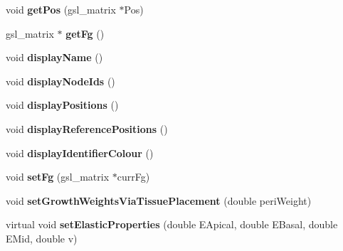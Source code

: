 \begin{DoxyCompactItemize}
\item 
\hypertarget{classShapeBase_ab1906a5afda8fcbeef23010759f2538c}{}void {\bfseries get\+Pos} (gsl\+\_\+matrix $\ast$Pos)\label{classShapeBase_ab1906a5afda8fcbeef23010759f2538c}

\item 
\hypertarget{classShapeBase_a79889ef9cb7831a50e5391cb1cc19793}{}gsl\+\_\+matrix $\ast$ {\bfseries get\+Fg} ()\label{classShapeBase_a79889ef9cb7831a50e5391cb1cc19793}

\item 
\hypertarget{classShapeBase_ab8a7323c50767ecdc82d8d8ce411b264}{}void {\bfseries display\+Name} ()\label{classShapeBase_ab8a7323c50767ecdc82d8d8ce411b264}

\item 
\hypertarget{classShapeBase_a324f8fd5dd90c14b621b2f2ee3ec98db}{}void {\bfseries display\+Node\+Ids} ()\label{classShapeBase_a324f8fd5dd90c14b621b2f2ee3ec98db}

\item 
\hypertarget{classShapeBase_aca4d0f70caf459dc93f914ef7fc2a053}{}void {\bfseries display\+Positions} ()\label{classShapeBase_aca4d0f70caf459dc93f914ef7fc2a053}

\item 
\hypertarget{classShapeBase_af2d221cf63220dad3ecf139ffa164698}{}void {\bfseries display\+Reference\+Positions} ()\label{classShapeBase_af2d221cf63220dad3ecf139ffa164698}

\item 
\hypertarget{classShapeBase_aba6bb76d8adffaeb7ad36cce8a3f17ab}{}void {\bfseries display\+Identifier\+Colour} ()\label{classShapeBase_aba6bb76d8adffaeb7ad36cce8a3f17ab}

\item 
\hypertarget{classShapeBase_ad39c3f3a555a89e106c4afaaf81c72f6}{}void {\bfseries set\+Fg} (gsl\+\_\+matrix $\ast$curr\+Fg)\label{classShapeBase_ad39c3f3a555a89e106c4afaaf81c72f6}

\item 
\hypertarget{classShapeBase_a38a100fb162232636bf666eb1603f023}{}void {\bfseries set\+Growth\+Weights\+Via\+Tissue\+Placement} (double peri\+Weight)\label{classShapeBase_a38a100fb162232636bf666eb1603f023}

\item 
\hypertarget{classShapeBase_a948e9da80e40851c9813f8251d1979ec}{}virtual void {\bfseries set\+Elastic\+Properties} (double E\+Apical, double E\+Basal, double E\+Mid, double v)\label{classShapeBase_a948e9da80e40851c9813f8251d1979ec}


\end{DoxyCompactItemize}
